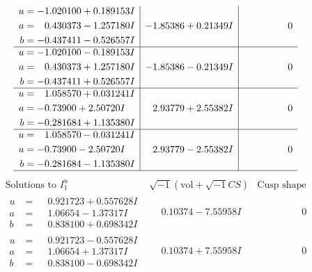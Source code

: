 \documentclass[1p]{elsarticle_modified}
\theoremstyle{definition}
\newcommand{\I}{\sqrt{-1}}
\begin{document}
$$\begin{array}{c|c|c}
\begin{aligned}
u &= -1.020100 + 0.189153 I \\
a &= \phantom{-}0.430373 - 1.257180 I \\
b &= -0.437411 - 0.526557 I\end{aligned}
 & -1.85386 + 0.21349 I & \phantom{-0.000000 } 0 \\ \hline\begin{aligned}
u &= -1.020100 - 0.189153 I \\
a &= \phantom{-}0.430373 + 1.257180 I \\
b &= -0.437411 + 0.526557 I\end{aligned}
 & -1.85386 - 0.21349 I & \phantom{-0.000000 } 0 \\ \hline\begin{aligned}
u &= \phantom{-}1.058570 + 0.031241 I \\
a &= -0.73900 + 2.50720 I \\
b &= -0.281684 + 1.135380 I\end{aligned}
 & \phantom{-}2.93779 + 2.55382 I & \phantom{-0.000000 } 0 \\ \hline\begin{aligned}
u &= \phantom{-}1.058570 - 0.031241 I \\
a &= -0.73900 - 2.50720 I \\
b &= -0.281684 - 1.135380 I\end{aligned}
 & \phantom{-}2.93779 - 2.55382 I & \phantom{-0.000000 } 0\\
 \hline 
 \end{array}$$\newpage$$\begin{array}{c|c|c}  
\text{Solutions to }I^u_{1}& \I (\text{vol} + \sqrt{-1}CS) & \text{Cusp shape}\\
 \hline 
\begin{aligned}
u &= \phantom{-}0.921723 + 0.557628 I \\
a &= \phantom{-}1.06654 - 1.37317 I \\
b &= \phantom{-}0.838100 + 0.698342 I\end{aligned}
 & \phantom{-}0.10374 - 7.55958 I & \phantom{-0.000000 } 0 \\ \hline\begin{aligned}
u &= \phantom{-}0.921723 - 0.557628 I \\
a &= \phantom{-}1.06654 + 1.37317 I \\
b &= \phantom{-}0.838100 - 0.698342 I\end{aligned}
 & \phantom{-}0.10374 + 7.55958 I & \phantom{-0.000000 } 0 \\ \hline\begin{aligned}

\end{aligned}
\end{array}$$
\end{document}
